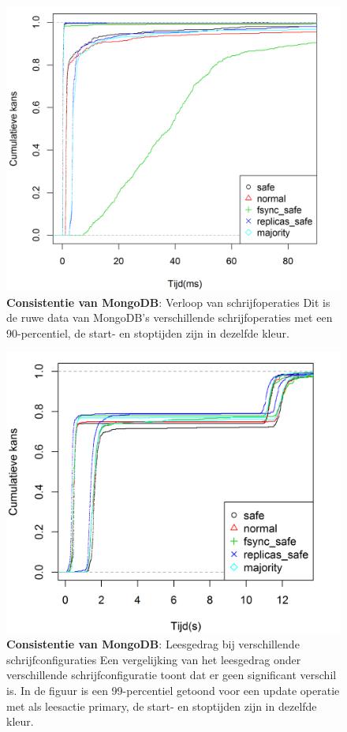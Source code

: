 \begin{figure}[htb!] 
	\centering
	\includegraphics[width=.7\textwidth]{img/Observaties/MongoDB/ECDF-Compare-Write-insert-1}
	\caption{\textbf{Consistentie van MongoDB}: Verloop van schrijfoperaties \newline
	Dit is de ruwe data van MongoDB's verschillende schrijfoperaties met een 90-percentiel, de start- en stoptijden zijn in dezelfde kleur.  }
	\label{fig:consistentie-mongodb-all-mongodb-write}
\end{figure}

\begin{figure}[ht!] 
	\centering \includegraphics[width=.70\textwidth]{img/Observaties/MongoDB/ECDF-Write-update-primarypreferred-1-2}
	\caption{\textbf{Consistentie van MongoDB}: Leesgedrag bij verschillende schrijfconfiguraties \newline
	Een vergelijking van het leesgedrag onder verschillende schrijfconfiguratie toont dat er geen significant verschil is. In de figuur is een 99-percentiel getoond voor een update operatie met als leesactie primary, de start- en stoptijden zijn in dezelfde kleur.  
	 } 
	\label{fig:consistentie-mongodb-verschillende-schrijfacties}
\end{figure}

